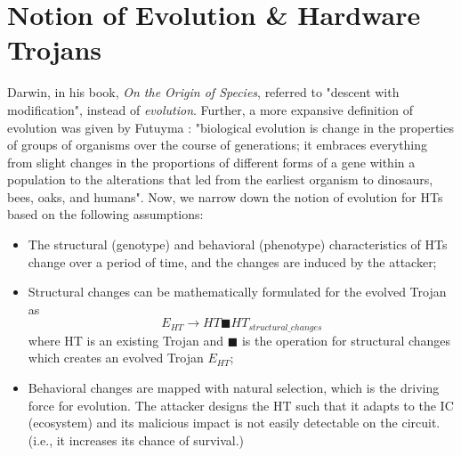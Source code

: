 \fi 

\section*{Notion of Evolution \& Hardware Trojans} 
\label{sec:Evolution}
Darwin, in his book, \textit{On the Origin of Species}, referred to "descent with modification", instead of \textit{evolution}. Further, a more expansive definition of evolution was given by Futuyma \cite{laland2014does}: "biological evolution is change in the properties of groups of organisms over the course of generations; it embraces everything from slight changes in the proportions of different forms of a gene within a population to the alterations that led from the earliest organism to dinosaurs, bees, oaks, and humans". Now, we narrow down the notion of evolution for HTs based on the following assumptions:

\begin{itemize}
    \item The structural (genotype) and behavioral (phenotype) characteristics of HTs change over a period of time, and the changes are induced by the attacker;
    \item Structural changes can be mathematically formulated for the evolved Trojan as \[ E_{HT} \rightarrow HT \blacksquare HT_{structural\_changes} \] 
    where HT is an existing Trojan and $\blacksquare$ is the operation for structural changes which creates an evolved Trojan $E_{HT}$;
    \item Behavioral changes are mapped with natural selection, which is the driving force for evolution. The attacker designs the HT such that it adapts to the IC (ecosystem) and its malicious impact is not easily detectable on the circuit. (i.e., it increases its chance of survival.)
\end{itemize}

